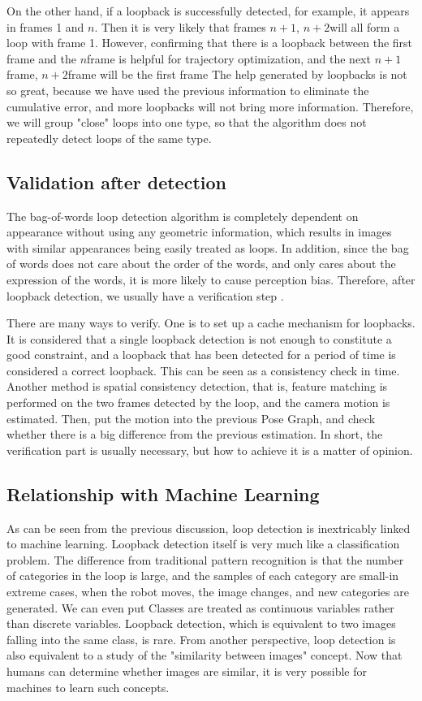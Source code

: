 On the other hand, if a loopback is successfully detected, for example, it appears in frames 1 and $n $. Then it is very likely that frames $n + 1 $, $n + 2 $will all form a loop with frame 1. However, confirming that there is a loopback between the first frame and the $n $frame is helpful for trajectory optimization, and the next $n + 1 $frame, $n + 2 $frame will be the first frame The help generated by loopbacks is not so great, because we have used the previous information to eliminate the cumulative error, and more loopbacks will not bring more information. Therefore, we will group "close" loops into one type, so that the algorithm does not repeatedly detect loops of the same type.

\subsection{Validation after detection}
The bag-of-words loop detection algorithm is completely dependent on appearance without using any geometric information, which results in images with similar appearances being easily treated as loops. In addition, since the bag of words does not care about the order of the words, and only cares about the expression of the words, it is more likely to cause perception bias. Therefore, after loopback detection, we usually have a verification step \textsuperscript{\cite{Latif2013, Cadena2012}}.

There are many ways to verify. One is to set up a cache mechanism for loopbacks. It is considered that a single loopback detection is not enough to constitute a good constraint, and a loopback that has been detected for a period of time is considered a correct loopback. This can be seen as a consistency check in time. Another method is spatial consistency detection, that is, feature matching is performed on the two frames detected by the loop, and the camera motion is estimated. Then, put the motion into the previous Pose Graph, and check whether there is a big difference from the previous estimation. In short, the verification part is usually necessary, but how to achieve it is a matter of opinion.

\subsection{Relationship with Machine Learning}
As can be seen from the previous discussion, loop detection is inextricably linked to machine learning. Loopback detection itself is very much like a classification problem. The difference from traditional pattern recognition is that the number of categories in the loop is large, and the samples of each category are small-in extreme cases, when the robot moves, the image changes, and new categories are generated. We can even put Classes are treated as continuous variables rather than discrete variables. Loopback detection, which is equivalent to two images falling into the same class, is rare. From another perspective, loop detection is also equivalent to a study of the "similarity between images" concept. Now that humans can determine whether images are similar, it is very possible for machines to learn such concepts.

